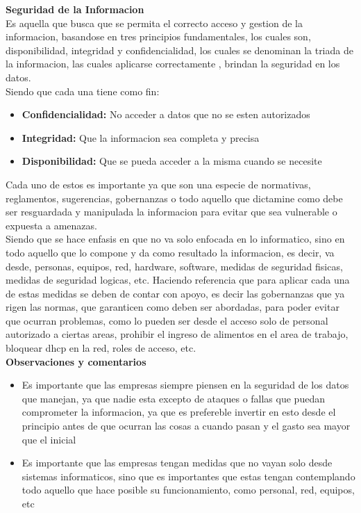 \documentclass[12pt]{article}
\begin{document}
\textbf{Seguridad de la Informacion } \\
Es aquella que busca que se permita el correcto acceso y gestion de la informacion, basandose en tres principios fundamentales, los cuales son, disponibilidad, integridad y confidencialidad, los cuales se denominan la triada de la informacion, las cuales aplicarse correctamente , brindan la seguridad en los datos.\\
Siendo que cada una tiene como fin:
\begin{itemize}
    \item\textbf{Confidencialidad: }{No acceder a datos que no se esten autorizados}
    \item\textbf{Integridad: }{Que la informacion sea completa y precisa}
    \item\textbf{Disponibilidad: }{Que se pueda acceder a la misma cuando se necesite}
\end{itemize}
Cada uno de estos es importante ya que son una especie de normativas, reglamentos, sugerencias, gobernanzas o todo aquello que dictamine como debe ser resguardada y manipulada la informacion para evitar que sea vulnerable o expuesta a amenazas. \\ 

Siendo que se hace enfasis en que no va solo enfocada en lo informatico, sino en todo aquello que lo compone y  da como resultado la informacion, es decir, va desde, personas, equipos, red, hardware, software, medidas de seguridad fisicas, medidas de seguridad logicas, etc. Haciendo referencia que para aplicar cada una de estas medidas se deben de contar con apoyo, es decir las gobernanzas que ya rigen las normas, que garanticen como deben ser abordadas, para poder evitar que ocurran problemas, como lo pueden ser desde el acceso solo de personal autorizado a ciertas areas, prohibir el ingreso de alimentos en el area de trabajo, bloquear dhcp en la red, roles de acceso, etc. \\


\noindent\textbf{Observaciones y comentarios} 
\begin{itemize}
    \item{Es importante que las empresas siempre piensen en la seguridad de los datos que manejan, ya que nadie esta excepto de ataques o fallas que puedan comprometer la informacion, ya que es prefereble invertir en esto desde el principio antes de que ocurran las cosas a cuando pasan y el gasto sea mayor que el inicial}
    \item{Es importante que las empresas tengan medidas que no vayan solo desde sistemas informaticos, sino que es importantes que estas tengan contemplando todo aquello que hace posible su funcionamiento, como personal, red, equipos, etc}
\end{itemize}
\end{document}
